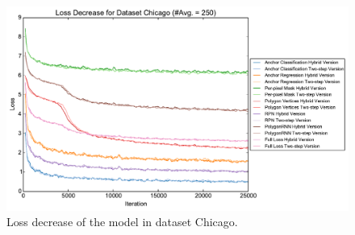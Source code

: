 \begin{figure}[!h]
	\centering
	\includegraphics[width=\fig\textwidth]{4-06.pdf}
    \caption[Loss decrease of the model in dataset Chicago]{Loss decrease of the model in dataset Chicago.}
	\label{fig:losdecch}
\end{figure}